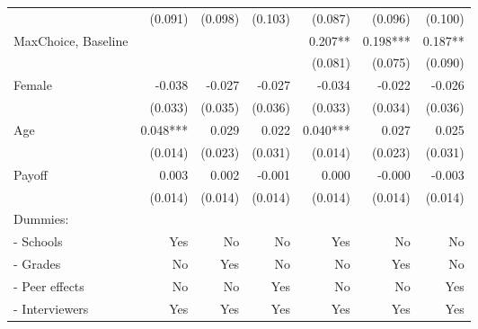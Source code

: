 \begin{table}[htbp]
\begin{adjustbox}{width=1\textwidth}
\begin{threeparttable}
\begin{tabular}{l*{6}{D{.}{.}{-1}}}
                    &             (0.091)   &             (0.098)   &             (0.103)   &             (0.087)   &             (0.096)   &             (0.100)   \\
MaxChoice, Baseline &                       &                       &                       &               0.207** &               0.198***&               0.187** \\
                    &                       &                       &                       &             (0.081)   &             (0.075)   &             (0.090)   \\
Female              &              -0.038   &              -0.027   &              -0.027   &              -0.034   &              -0.022   &              -0.026   \\
                    &             (0.033)   &             (0.035)   &             (0.036)   &             (0.033)   &             (0.034)   &             (0.036)   \\
Age                 &               0.048***&               0.029   &               0.022   &               0.040***&               0.027   &               0.025   \\
                    &             (0.014)   &             (0.023)   &             (0.031)   &             (0.014)   &             (0.023)   &             (0.031)   \\
Payoff              &               0.003   &               0.002   &              -0.001   &               0.000   &              -0.000   &              -0.003   \\
                    &             (0.014)   &             (0.014)   &             (0.014)   &             (0.014)   &             (0.014)   &             (0.014)   \\ \midrule
Dummies: &&&&&& \\
- Schools             &                 Yes   &                  No   &                  No   &                 Yes   &                  No   &                  No   \\
- Grades              &                  No   &                 Yes   &                  No   &                  No   &                 Yes   &                  No   \\
- Peer effects        &                  No   &                  No   &                 Yes   &                  No   &                  No   &                 Yes   \\
- Interviewers        &                 Yes   &                 Yes   &                 Yes   &                 Yes   &                 Yes   &                 Yes   \\

\end{tabular}
\end{threeparttable}
\end{adjustbox}
\end{table}
